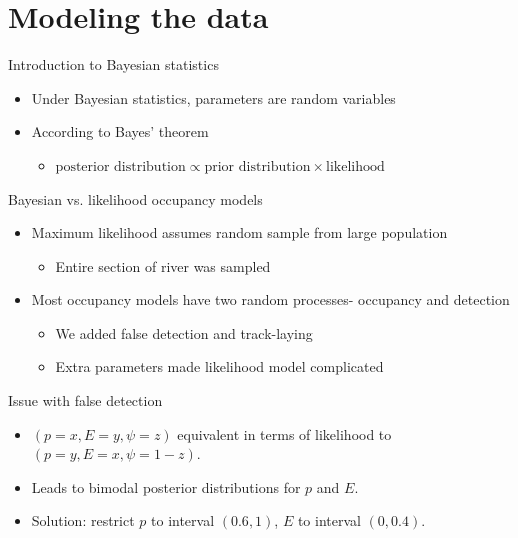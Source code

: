 \documentclass{beamer}
\begin{document}
\section{Modeling the data}
\begin{frame}{Introduction to Bayesian statistics}
	\begin{itemize}
		\item Under Bayesian statistics, parameters are random variables
		\item According to Bayes' theorem
		\begin{itemize}
			\item $\text{posterior distribution} \propto \text{prior 
			distribution}\times \text{likelihood}$
		\end{itemize}
	\end{itemize}
\end{frame}

\begin{frame}{Bayesian vs. likelihood occupancy models}
	\begin{itemize}
		\item Maximum likelihood assumes random sample from large population
		\begin{itemize}
			\item Entire section of river was sampled
		\end{itemize}
		\item Most occupancy models have two random processes- occupancy and 
		detection
		\begin{itemize}
			\item We added false detection and track-laying
			\item Extra parameters made likelihood model complicated
		\end{itemize}
	\end{itemize}
\end{frame}

\begin{frame}{Issue with false detection}
	\begin{itemize}
		\item $(p=x, E=y, \psi=z)$ equivalent in terms of likelihood to 
		$(p=y,E=x,\psi=1-z)$.
		\item Leads to bimodal posterior distributions for $p$ and $E$.
		\item Solution: restrict $p$ to interval $(0.6,1)$, $E$ to interval 
		$(0,0.4)$.
	\end{itemize}
\end{frame}
\end{document}
